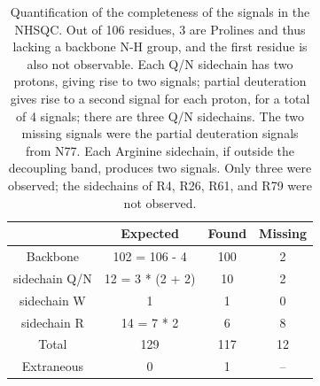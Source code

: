 \begin{table}
    \begin{tabular}{ | c || c | c || c | }
        \hline
                        &  Expected         &  Found    &  Missing  \\  \hline \hline
        Backbone        &  102 = 106 - 4    &  100      &  2        \\  \hline
        sidechain Q/N   &  12 = 3 * (2 + 2) &  10       &  2        \\  \hline
        sidechain W     &  1                &  1        &  0        \\  \hline
        sidechain R     &  14 = 7 * 2       &  6        &  8        \\  \hline \hline
        Total           &  129              &  117      &  12       \\  \hline \hline
        Extraneous      &  0                &  1        &  --       \\  \hline
    \end{tabular}
    \caption[Quantification of the completeness of the signals in the NHSQC.]
            {Quantification of the completeness of the signals in the NHSQC.
             Out of 106 residues, 3 are Prolines and thus lacking a backbone
             N-H group, and the first residue is also not observable.
             Each Q/N sidechain has two protons, giving rise to two signals;
             partial deuteration gives rise to a second signal for each proton,
             for a total of 4 signals; there are three Q/N sidechains.  The
             two missing signals were the partial deuteration signals from N77.
             Each Arginine sidechain, if outside the decoupling band,
             produces two signals.  Only three were observed; the sidechains
             of R4, R26, R61, and R79 were not observed.}
    \label{nhsqc_signals}
\end{table}

